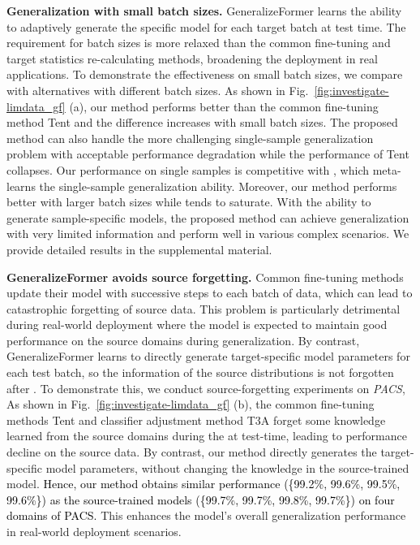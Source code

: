 \vspace{0.5mm}
\noindent
\textbf{Generalization with small batch sizes.}
GeneralizeFormer learns the ability to adaptively generate the specific model for each target batch at test time. 
The requirement for batch sizes is more relaxed than the common fine-tuning and target statistics re-calculating methods, broadening the deployment in real applications. 
To demonstrate the effectiveness on small batch sizes, we compare with alternatives with different batch sizes. 
As shown in Fig.~\ref{fig:investigate-limdata_gf} (a), our method performs better than the common fine-tuning method Tent and the difference increases with small batch sizes. 
The proposed method can also handle the more challenging single-sample generalization problem with acceptable performance degradation while the performance of Tent collapses. Our performance on single samples is competitive with \cite{xiao2022learning}, which meta-learns the single-sample generalization ability.
Moreover, our method performs better with larger batch sizes while \cite{xiao2022learning} tends to saturate.
With the ability to generate sample-specific models, the proposed method can achieve generalization with very limited information and perform well in various complex scenarios.
We provide detailed results in the supplemental material. 








\noindent
\textbf{GeneralizeFormer avoids source forgetting.}
Common fine-tuning methods update their model with successive steps to each batch of data, which can lead to catastrophic forgetting of source data. 
This problem is particularly detrimental during real-world deployment where the model is expected to maintain good performance on the source domains during generalization.
By contrast, GeneralizeFormer learns to directly generate target-specific model parameters for each test batch, so the information of the source distributions is not forgotten after .
To demonstrate this, we conduct source-forgetting experiments on \textit{PACS}, 
As shown in Fig.~\ref{fig:investigate-limdata_gf} (b), the common fine-tuning methods Tent and classifier adjustment method T3A \cite{iwasawa2021test} forget some knowledge learned from the source domains during the  at test-time, leading to performance decline on the source data. 
By contrast, our method directly generates the target-specific model parameters, without changing the knowledge in the source-trained model. \textcolor{black}{Hence, our method obtains similar performance (\{99.2\%, 99.6\%, 99.5\%, 99.6\%\}) as the source-trained models (\{99.7\%, 99.7\%, 99.8\%, 99.7\%\}) on four domains of PACS. 
}
This enhances the model's overall generalization performance in real-world deployment scenarios. 

